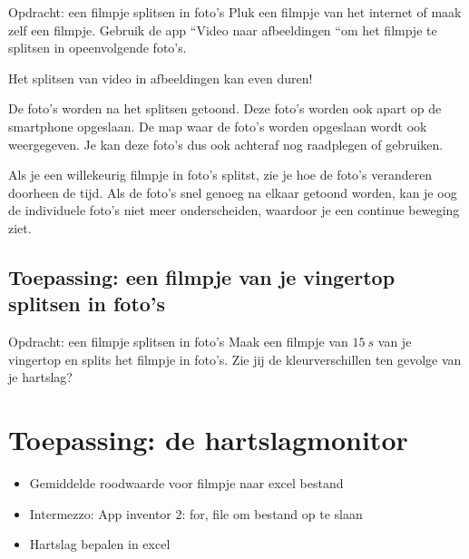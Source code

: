 \begin{opdracht}{Opdracht: een filmpje splitsen in foto's}
Pluk een filmpje van het internet of maak zelf een filmpje. Gebruik de app \textquotedblleft Video naar afbeeldingen \textquotedblleft om het filmpje te splitsen in opeenvolgende foto's. 

\begin{opmerking}
Het splitsen van video in afbeeldingen kan even duren!
\end{opmerking}

De foto's worden na het splitsen getoond. Deze foto's worden ook apart op de smartphone opgeslaan. De map waar de foto's worden opgeslaan wordt ook weergegeven. Je kan deze foto's dus ook achteraf nog raadplegen of gebruiken.

\end{opdracht}

Als je een willekeurig filmpje in foto's splitst, zie je hoe de foto's veranderen doorheen de tijd. Als de foto's snel genoeg na elkaar getoond worden, kan je oog de individuele foto's niet meer onderscheiden, waardoor je een continue beweging ziet.

\subsection{Toepassing: een filmpje van je vingertop splitsen in foto's}

\begin{opdracht}{Opdracht: een filmpje splitsen in foto's}
	Maak een filmpje van $15~s$ van je vingertop en splits het filmpje in foto's. Zie jij de kleurverschillen ten gevolge van je hartslag?
\end{opdracht}


\section{Toepassing: de hartslagmonitor}
\label{sec:Mod3_Sec3}
%

\begin{itemize}
	\item Gemiddelde roodwaarde voor filmpje naar excel bestand
	\item Intermezzo: App inventor 2: for, file om bestand op te slaan
	\item Hartslag bepalen in excel
\end{itemize}

